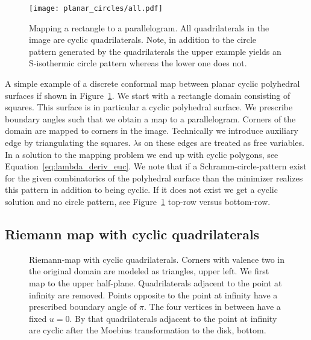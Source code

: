 \documentclass[Thesis]{subfiles}
\begin{document}
\begin{figure}
\centering
\texttt{[image: planar\_circles/all.pdf]}
\\
\caption{
Mapping a rectangle to a parallelogram.
All quadrilaterals in the image are cyclic quadrilaterals.
Note, in addition to the circle pattern generated by the quadrilaterals the upper example yields an S-isothermic circle pattern whereas the lower one does not.
}
\label{fig:cyclic_parallelogram}
\end{figure}

A simple example of a discrete conformal map between planar cyclic polyhedral surfaces if shown in 
Figure~\ref{fig:cyclic_parallelogram}. We start with a rectangle domain consisting of squares. This surface 
is in particular a cyclic polyhedral surface. We prescribe boundary angles such that we obtain a map to a 
parallelogram. Corners of the domain are mapped to corners in the image.
Technically we introduce auxiliary edge by triangulating the squares. $\lambda$s on these edges are treated
as free variables. In a solution to the mapping problem we end up with cyclic polygons, see Equation~\ref{eq:lambda_deriv_euc}.
We note that if a Schramm-circle-pattern \cite{S97} exist for the given combinatorics of the polyhedral surface than
the minimizer realizes this pattern in addition to being cyclic. 
If it does not exist we get a cyclic solution and no circle pattern, see Figure~\ref{fig:cyclic_parallelogram}
top-row versus bottom-row.


\subsection{Riemann map with cyclic quadrilaterals}

\begin{figure}
\centering
{}
\caption{
Riemann-map with cyclic quadrilaterals.
Corners with valence two in the original domain are modeled as triangles, upper left.
We first map to the upper half-plane.
Quadrilaterals adjacent to the point at infinity are removed.
Points opposite to the point at infinity have a prescribed boundary angle of $\pi$.
The four vertices in between have a fixed $u=0$.
By that quadrilaterals adjacent to the point at infinity are cyclic after the Moebius transformation to the disk, bottom.
}
\label{fig:circular_riemann}
\end{figure}
\end{document}
